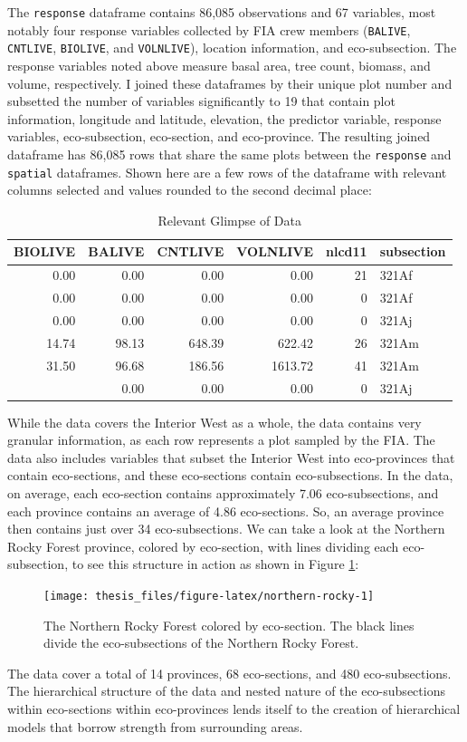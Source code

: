 \documentclass[12pt,twoside]{reedthesis}
\begin{document}
The \texttt{response} dataframe contains 86,085 observations and 67 variables, most notably four response variables collected by FIA crew members (\texttt{BALIVE}, \texttt{CNTLIVE}, \texttt{BIOLIVE}, and \texttt{VOLNLIVE}), location information, and eco-subsection. The response variables noted above measure basal area, tree count, biomass, and volume, respectively. I joined these dataframes by their unique plot number and subsetted the number of variables significantly to 19 that contain plot information, longitude and latitude, elevation, the predictor variable, response variables, eco-subsection, eco-section, and eco-province. The resulting joined dataframe has 86,085 rows that share the same plots between the \texttt{response} and \texttt{spatial} dataframes. Shown here are a few rows of the dataframe with relevant columns selected and values rounded to the second decimal place:
\begin{longtable}[t]{rrrrrl}
\caption[Relevant Glimpse of Data]{\label{tab:unnamed-chunk-3}Relevant Glimpse of Data}\\
\toprule
BIOLIVE & BALIVE & CNTLIVE & VOLNLIVE & nlcd11 & subsection\\
\midrule
0.00 & 0.00 & 0.00 & 0.00 & 21 & 321Af\\
0.00 & 0.00 & 0.00 & 0.00 & 0 & 321Af\\
0.00 & 0.00 & 0.00 & 0.00 & 0 & 321Aj\\
14.74 & 98.13 & 648.39 & 622.42 & 26 & 321Am\\
31.50 & 96.68 & 186.56 & 1613.72 & 41 & 321Am\\
\addlinespace
0.00 & 0.00 & 0.00 & 0.00 & 0 & 321Aj\\
\bottomrule
\end{longtable}
While the data covers the Interior West as a whole, the data contains very granular information, as each row represents a plot sampled by the FIA. The data also includes variables that subset the Interior West into eco-provinces that contain eco-sections, and these eco-sections contain eco-subsections. In the data, on average, each eco-section contains approximately 7.06 eco-subsections, and each province contains an average of 4.86 eco-sections. So, an average province then contains just over 34 eco-subsections. We can take a look at the Northern Rocky Forest province, colored by eco-section, with lines dividing each eco-subsection, to see this structure in action as shown in Figure \ref{fig:northern-rocky}:
\begin{figure}

{\centering \texttt{[image: thesis\_files/figure-latex/northern-rocky-1]} 

}

\caption[The Northern Rocky Forest colored by eco-section]{The Northern Rocky Forest colored by eco-section. The black lines divide the eco-subsections of the Northern Rocky Forest.}\label{fig:northern-rocky}
\end{figure}
The data cover a total of 14 provinces, 68 eco-sections, and 480 eco-subsections. The hierarchical structure of the data and nested nature of the eco-subsections within eco-sections within eco-provinces lends itself to the creation of hierarchical models that borrow strength from surrounding areas.
\end{document}
